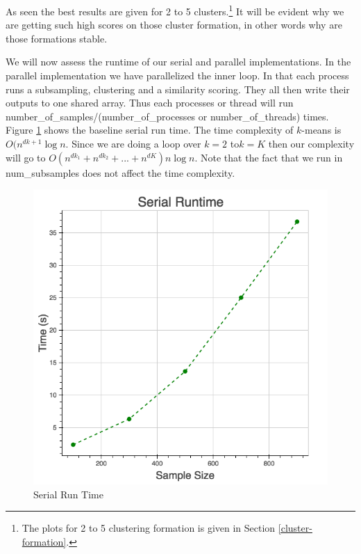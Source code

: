 \documentclass[10pt,twocolumn,letterpaper]{article}
\begin{document}
As seen the best results are given for 2 to 5 clusters.\footnote{The plots for 2 to 5 clustering formation is given in Section \ref{cluster-formation}.} It will be evident why we are getting such high scores on those cluster
formation, in other words why are those formations stable. 

We will now assess the runtime of our serial and parallel implementations.
In the parallel implementation we have parallelized the inner loop.
In that each process runs a subsampling, clustering and a similarity
scoring. They all then write their outputs to one shared array. Thus
each processes or thread will run number\_of\_samples/(number\_of\_processes
or number\_of\_threads) times. Figure \ref{fig:Serial-Run-Time} shows
the baseline serial run time. The time complexity of $k$-means is $O(n^{dk+1}\log n$.
Since we are doing a loop over $k=2$ to$ k=K$ then our complexity will
go to $O(n^{dk_1}+n^{dk_2}+ ... +n^{dK})n \log n$. Note that the fact
that we run in num\_subsamples does not affect the time complexity. 

\begin{figure}[htbp] 
\begin{center}
\includegraphics[scale=0.35]{figure/serial.png}
\end{center}

\caption{\label{fig:Serial-Run-Time}Serial Run Time}
\end{figure}
\end{document}
